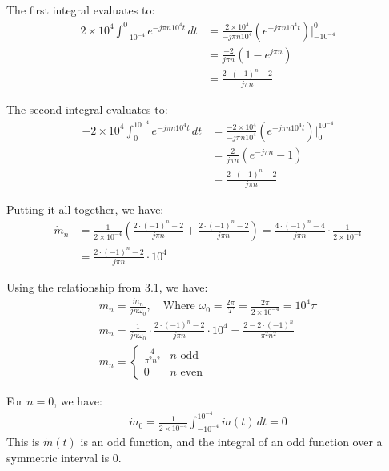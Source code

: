\documentclass{article}
\begin{document}
\begin{enumerate}[label=3.\arabic*]
    The first integral evaluates to:
    \begin{align*}
        2\times10^4\int_{-10^{-4}}^{0} e^{-j\pi n10^{4}t} \, dt &= \frac{2\times10^4}{-j\pi n10^{4}}\left(e^{-j\pi n10^{4}t}\right)\Big|_{-10^{-4}}^{0} \\
        &= \frac{-2}{j\pi n}\left(1 - e^{j\pi n}\right) \\
        &= \frac{2\cdot(-1)^n - 2}{j\pi n}
    \end{align*}

    The second integral evaluates to:
    \begin{align*}
        -2\times10^4\int_{0}^{10^{-4}} e^{-j\pi n10^{4}t} \, dt &= \frac{-2\times10^4}{-j\pi n10^{4}}\left(e^{-j\pi n10^{4}t}\right)\Big|_{0}^{10^{-4}} \\
        &= \frac{2}{j\pi n}\left(e^{-j\pi n} - 1\right) \\
        &= \frac{2\cdot(-1)^n - 2}{j\pi n}
    \end{align*}

    Putting it all together, we have:
    \begin{align*}
        \dot{m}_n &= \frac{1}{2\times10^{-4}}\left(\frac{2\cdot(-1)^n - 2}{j\pi n} + \frac{2\cdot(-1)^n - 2}{j\pi n}\right) = \frac{4\cdot(-1)^n - 4}{j\pi n} \cdot \frac{1}{2\times10^{-4}} \\
        &= \frac{2\cdot(-1)^n - 2}{j\pi n} \cdot 10^4
    \end{align*}

    Using the relationship from 3.1, we have:
    \begin{align*}
        m_n = \frac{\dot{m}_n}{jn\omega_0}, \quad \text{Where } \omega_0 = \frac{2\pi}{T} = \frac{2\pi}{2\times10^{-4}} = 10^4\pi \\
        m_n = \frac{1}{jn\omega_0} \cdot \frac{2\cdot(-1)^n - 2}{j\pi n} \cdot 10^4 = \frac{2-2\cdot(-1)^n}{\pi^2 n^2} \\
        m_n = \begin{cases}
            \frac{4}{\pi^2 n^2} & n \text{ odd} \\
            0 & n \text{ even}
        \end{cases}
    \end{align*}

    For $n=0$, we have:
    \begin{align*}
        \dot{m}_0 = \frac{1}{2\times10^{-4}}\int_{-10^{-4}}^{10^{-4}} \dot{m}(t) \, dt = 0
    \end{align*}
    This is $\dot{m}(t)$ is an odd function, and the integral of an odd function over a symmetric interval is 0.


\end{enumerate}
\end{document}
